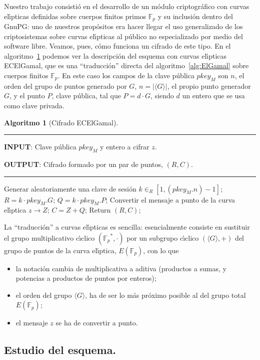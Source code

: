 \documentclass{llncs}
\def\ce{curva{} el\'{\i}ptica}%
\def\ces{curvas{} el\'{\i}pticas}%
\newcommand{\Fp}{\ensuremath{\mathbb{F}_p}}%
\theoremstyle{plain}        			%
\theoremstyle{definition}   			%
\theoremstyle{saltolinea}   			%
\newtheorem{algo}{Algoritmo}
\begin{document}
Nuestro trabajo consisti\'o en el desarrollo de un m\'odulo criptogr\'afico con \ces{} definidas sobre cuerpos finitos primos $\Fp$ y su inclusi\'on dentro del GnuPG: uno de nuestros prop\'ositos era hacer llegar el uso generalizado de los criptosistemas sobre \ces{} al p\'ublico no especializado por medio del software libre. Veamos, pues, c\'omo funciona un cifrado de este tipo. En el algoritmo~\ref{alg:ECElGamal} podemos ver la descripci\'on del esquema con \ces{} ECElGamal, que es una ``traducci\'on'' directa del algoritmo~\ref{alg:ElGamal} sobre cuerpos finitos $\Fp$. En este caso los campos de la clave p\'ublica $pkey_M$ son $n$, el orden del grupo de puntos generado por $G$, $n=|\langle G\rangle|$, el propio punto generador $G$, y el punto $P$, clave p\'ublica, tal que $P=d\cdot G$, siendo $d$ un entero que se usa como clave privada.

\begin{algo}[Cifrado ECElGamal]\label{alg:ECElGamal}
\parbox[b]{\linewidth}{%
\hrule
\smallskip
{\bf INPUT}: Clave p\'ublica $pkey_{M}$ y entero a cifrar $z$.

{\bf OUTPUT}: Cifrado formado por un par de puntos, $(R,C)$.
\vspace{1.5mm}
\hrule
}%
\begin{algorithmic}[1]
\STATE Generar aleatoriamente una clave de sesi\'on $k\in_{R}\left[1,\left(pkey_{M}.n\right)-1\right]$;
\STATE $R=k\cdot pkey_{M}.G$;
\STATE $Q=k\cdot pkey_{M}.P$; 
\STATE Convertir el mensaje a punto de la \ce{} $z\rightarrow Z$;
\STATE $C=Z+Q$;
\STATE Return $(R,C)$;
\end{algorithmic}
\end{algo}

La ``traducci\'on'' a \ces{} es sencilla: esencialmente consiste en sustituir el grupo multiplicativo c\'{\i}clico $(\Fp^*,\cdot)$ por un subgrupo c\'{\i}clico $(\langle G\rangle,+)$ del grupo de puntos de la \ce{}, $E(\Fp)$, con lo que
\begin{itemize}
	\item la notaci\'on cambia de multiplicativa a aditiva (productos a sumas, y potencias a productos de puntos por enteros);
	\item el orden del grupo $\langle G\rangle$, ha de ser lo m\'as pr\'oximo posible al del grupo total $E(\Fp)$;
	\item el mensaje $z$ se ha de convertir a punto.
\end{itemize}


\subsection*{Estudio del esquema.}
\end{document}
